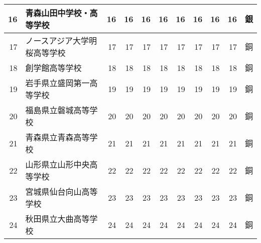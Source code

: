 \documentclass[11pt,a4paper,landscape,twoside,openany,english,uplatex]{jsarticle}
\begin{document}
\begin{table}[h]
\begin{tabular}{r|l||rrrrrrr|r|c}
  16 & 青森山田中学校・高等学校     &  16 & 16 & 16 & 16 & 16 & 16 & 16 & 16 & 銀 \\
  \hline                                                                      
  17 & ノースアジア大学明桜高等学校 &  17 & 17 & 17 & 17 & 17 & 17 & 17 & 17 & 銅 \\
  18 & 創学館高等学校               &  18 & 18 & 18 & 18 & 18 & 18 & 18 & 18 & 銅 \\
  19 & 岩手県立盛岡第一高等学校     &  19 & 19 & 19 & 19 & 19 & 19 & 19 & 19 & 銅 \\
  20 & 福島県立磐城高等学校         &  20 & 20 & 20 & 20 & 20 & 20 & 20 & 20 & 銅 \\
  21 & 青森県立青森高等学校         &  21 & 21 & 21 & 21 & 21 & 21 & 21 & 21 & 銅 \\
  22 & 山形県立山形中央高等学校     &  22 & 22 & 22 & 22 & 22 & 22 & 22 & 22 & 銅 \\
  23 & 宮城県仙台向山高等学校       &  23 & 23 & 23 & 23 & 23 & 23 & 23 & 23 & 銅 \\
  24 & 秋田県立大曲高等学校         &  24 & 24 & 24 & 24 & 24 & 24 & 24 & 24 & 銅 \\

  \hline
 \end{tabular}
\end{table}
\end{document}
